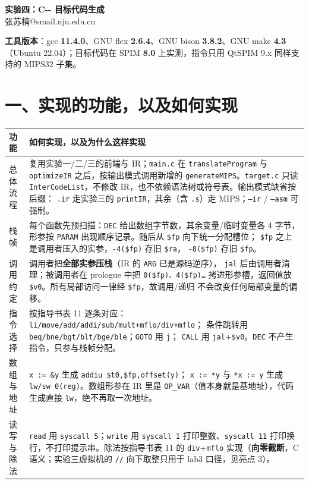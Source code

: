\documentclass[11pt,a4paper]{ctexart}
\newcommand{\code}[1]{\texttt{#1}}
\begin{document}
\begin{center}
{\large\bfseries 实验四：C{-}{-} 目标代码生成}\\[3pt]
张苏楠@smail.nju.edu.cn
\end{center}

\textbf{工具版本}：gcc \textbf{11.4.0}、GNU flex \textbf{2.6.4}、GNU bison
\textbf{3.8.2}、GNU make \textbf{4.3}（Ubuntu 22.04）；目标代码在 SPIM
\textbf{8.0} 上实测，指令只用 QtSPIM 9.x 同样支持的 MIPS32 子集。

\section*{一、实现的功能，以及如何实现}

{\normalsize
\setlength{\parindent}{0pt}
\begin{tabular}{@{}>{\raggedright\arraybackslash}m{2.7cm}m{13.3cm}@{}}
\hline
\textbf{功能} & \textbf{如何实现，以及为什么这样实现} \\
\hline
总体流程 & 复用实验一/二/三的前端与 IR；\code{main.c} 在 \code{translateProgram} 与
\code{optimizeIR} 之后，按输出模式调用新增的 \code{generateMIPS}。\code{target.c}
只读 \code{InterCodeList}，不修改 IR，也不依赖语法树或符号表。输出模式缺省按后缀：
\code{.ir} 走实验三的 \code{printIR}，其余（含 \code{.s}）走 MIPS；\code{--ir} /
\code{--asm} 可强制。\\
\hline
栈帧 & 每个函数先预扫描：\code{DEC} 给出数组字节数，其余变量/临时变量各 4 字节，
形参按 \code{PARAM} 出现顺序记录。随后从 \code{\$fp} 向下统一分配槽位；
\code{\$fp} 之上是调用者压入的实参，\code{-4(\$fp)} 存旧 \code{\$ra}，
\code{-8(\$fp)} 存旧 \code{\$fp}。\\
\hline
调用约定 & 调用者把\textbf{全部实参压栈}（IR 的 \code{ARG} 已是源码逆序），
\code{jal} 后由调用者清理；被调用者在 prologue 中把 \code{0(\$fp)、4(\$fp)…}
拷进形参槽，返回值放 \code{\$v0}。所有局部访问一律经 \code{\$fp}，故调用/递归
不会改变任何局部变量的偏移。\\
\hline
指令选择 & 按指导书表 11 逐条对应：\code{li/move/add/addi/sub/mult+mflo/div+mflo}；
条件跳转用 \code{beq/bne/bgt/blt/bge/ble}；\code{GOTO} 用 \code{j}；
\code{CALL} 用 \code{jal}+\code{\$v0}。\code{DEC} 不产生指令，只参与栈帧分配。\\
\hline
数组与地址 & \code{x := \&y} 生成 \code{addiu \$t0,\$fp,offset(y)}；
\code{x := *y} 与 \code{*x := y} 生成 \code{lw/sw 0(reg)}。数组形参在 IR 里是
\code{OP\_VAR}（值本身就是基地址），代码生成直接 \code{lw}，绝不再取一次地址。\\
\hline
读写与除法 & \code{read} 用 \code{syscall 5}；\code{write} 用 \code{syscall 1}
打印整数、\code{syscall 11} 打印换行，不打印提示串。除法按指导书表 11 的
\code{div}+\code{mflo} 实现（\textbf{向零截断}，C 语义；实验三虚拟机的
\code{//} 向下取整只用于 lab3 口径，见亮点 3）。\\
\hline
\end{tabular}}
\end{document}
